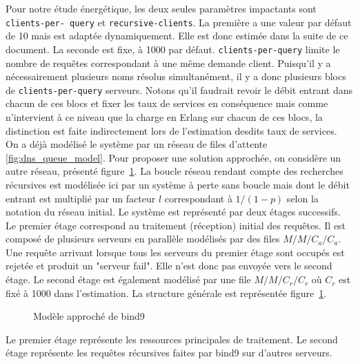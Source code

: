 \documentclass[12pt, a4paper]{report}
\begin{document}
	\vspace{0.25cm}
	\noindent Pour notre étude énergétique, les deux seules paramètres impactants sont \texttt{clients-per- query} et \verb+recursive-clients+. La première a une valeur par défaut de 10
	mais est adaptée dynamiquement. Elle est donc estimée dans la suite de ce document. La seconde est fixe, à 1000 par défaut. \verb+clients-per-query+ limite le nombre de requêtes
	correspondant à une même demande client. Puisqu'il y a nécessairement plusieurs noms résolus simultanément, il y a donc plusieurs blocs de \verb+clients-per-query+ serveurs.
	Notons qu'il faudrait revoir le débit entrant dans chacun de ces blocs et fixer les taux de services en conséquence mais comme n'intervient à ce niveau que la charge en Erlang
	sur chacun de ces blocs, la distinction est faite indirectement lors de l'estimation desdits taux de services.\\


	\noindent On a déjà modélisé le système par un réseau de files d'attente \ref{fig:dns_queue_model}. Pour proposer une solution approchée, on considère un autre réseau, présenté figure~\ref{modeleApproche}.
	La boucle réseau rendant compte des recherches récursives est modélisée ici par un système à perte sans boucle mais dont le débit entrant est multiplié par un facteur $l$
	correspondant à $1/(1-p)$ selon la notation du réseau initial. Le système est représenté par deux étages successifs.
	Le premier étage correspond au traitement (réception) initial des requêtes. Il est composé de plusieurs serveurs en parallèle modélisés par des
	files $M/M/C_a/C_a$. 
	Une requête arrivant lorsque tous les serveurs du premier étage sont occupés est rejetée et produit un "serveur fail". Elle n'est donc pas envoyée vers le second étage.
	Le second étage est également modélisé par une file $M/M/C_r/C_r$ où $C_r$ est fixé à 1000 dans l'estimation. La structure générale est représentée figure~\ref{modeleApproche}.


	\begin{center}

		\begin{figure}[htbp]
	\centering
			\scalebox{0.5}{}
	\caption{Modèle approché de bind9}
	\label{modeleApproche}
	\end{figure}
	\end{center}


	\noindent Le premier étage représente les ressources principales de traitement. Le second étage représente les requêtes récursives faites par bind9 sur d'autres serveurs.
\end{document}
